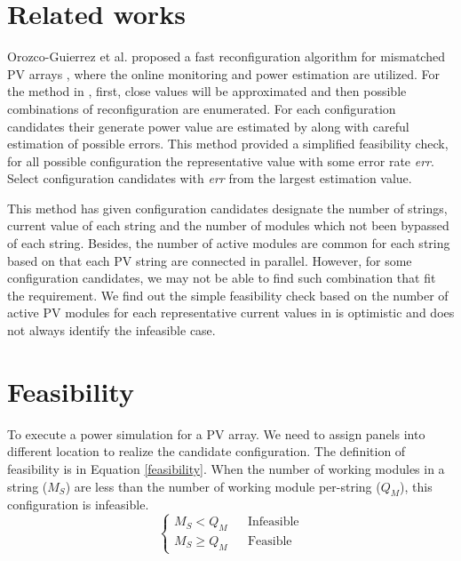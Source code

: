 \documentclass[conference]{IEEEtran}
\begin{document}
\section{Related works}\label{Sec3}
Orozco-Guierrez et al. proposed a fast reconfiguration algorithm for mismatched PV arrays \cite{orozco2016optimized}, where the online monitoring \cite{carotenuto2014online} and power estimation \cite{orozco2015fast} are utilized. For the method in \cite{orozco2016optimized}, first, close values will be approximated and then possible combinations of reconfiguration are enumerated. For each configuration candidates their generate power value are estimated by \cite{orozco2015fast} along with careful estimation of possible errors. This method provided a simplified feasibility check, for all possible configuration the representative value with some error rate \textit{err}. Select configuration candidates with \textit{err} from the largest estimation value.

This method has given configuration candidates designate the number of strings, current value of each string and the number of modules which not been bypassed of each string. Besides, the number of active modules are common for each string based on that each PV string are connected in parallel. However, for some configuration candidates, we may not be able to find such combination that fit the requirement. We find out the simple feasibility check based on the number of active PV modules for each representative current values in \cite{orozco2016optimized} is optimistic and does not always identify the infeasible case.
\section{Feasibility}\label{Sec4}
To execute a power simulation for a PV array. We need to assign panels into different location to realize the candidate configuration. The definition of feasibility is in Equation \ref{feasibility}. When the number of working modules in a string ($M_S$) are less than the number of working module per-string ($Q_M$), this configuration is infeasible.
\begin{equation}
    \left\{\begin{matrix}
        M_S < Q_{M} & & \text{Infeasible}\\ 
        M_S \geqslant Q_{M} & & \text{Feasible} 
    \end{matrix}\right.
    \label{feasibility}
\end{equation}
\end{document}
